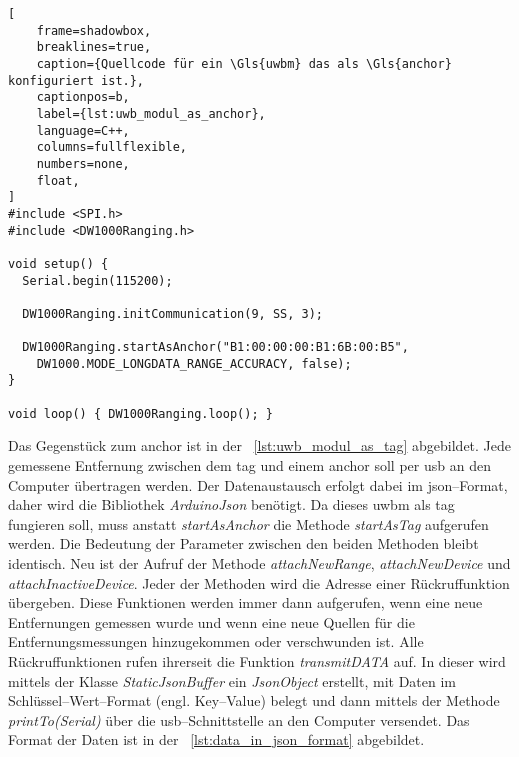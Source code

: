 \begin{lstlisting}[
	frame=shadowbox,
	breaklines=true,
	caption={Quellcode für ein \Gls{uwbm} das als \Gls{anchor} konfiguriert ist.},
	captionpos=b,
	label={lst:uwb_modul_as_anchor},
	language=C++,
	columns=fullflexible,
	numbers=none,
	float,
]
#include <SPI.h>
#include <DW1000Ranging.h>

void setup() {
  Serial.begin(115200);

  DW1000Ranging.initCommunication(9, SS, 3);
  
  DW1000Ranging.startAsAnchor("B1:00:00:00:B1:6B:00:B5",
    DW1000.MODE_LONGDATA_RANGE_ACCURACY, false);
}

void loop() { DW1000Ranging.loop(); }
\end{lstlisting}

Das Gegenstück zum \Gls{anchor} ist in der \lstlistingname~\ref{lst:uwb_modul_as_tag} abgebildet. Jede gemessene Entfernung zwischen dem \Gls{tag} und einem \Gls{anchor} soll per \Gls{usb} an den Computer übertragen werden. Der Datenaustausch erfolgt dabei im \Gls{json}--Format, daher wird die Bibliothek \textit{ArduinoJson} benötigt.
Da dieses \Gls{uwbm} als \Gls{tag} fungieren soll, muss anstatt \textit{startAsAnchor} die Methode \textit{startAsTag} aufgerufen werden. Die Bedeutung der Parameter zwischen den beiden Methoden bleibt identisch.
Neu ist der Aufruf der Methode \textit{attachNewRange}, \textit{attachNewDevice} und \textit{attachInactiveDevice}. Jeder der Methoden wird die Adresse einer Rückruffunktion übergeben. Diese Funktionen werden immer dann aufgerufen, wenn eine neue Entfernungen gemessen wurde und wenn eine neue Quellen für die Entfernungsmessungen hinzugekommen oder verschwunden ist.
Alle Rückruffunktionen rufen ihrerseit die Funktion \textit{transmitDATA} auf. In dieser wird mittels der Klasse \textit{StaticJsonBuffer} ein \textit{JsonObject} erstellt, mit Daten im Schlüssel--Wert--Format (engl. Key--Value) belegt und dann mittels der Methode \textit{printTo(Serial)} über die \Gls{usb}--Schnittstelle an den Computer versendet. Das Format der Daten ist in der \lstlistingname~\ref{lst:data_in_json_format} abgebildet.

